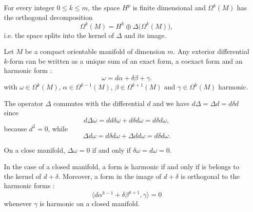 \begin{theorem}
	For every integer $0\leq k\leq m$, the space $H^p$ is finite dimensional and $\Omega^k(M)$ has the orthogonal decomposition
	\begin{equation}
		\Omega^k(M)=H^k\oplus\Delta\big( \Omega^k(M) \big),
	\end{equation}
	i.e. the space splits into the kernel of $\Delta$ and its image.
\end{theorem}

\begin{theorem}
	Let $M$ be a compact orientable manifold of dimension $m$. Any exterior differential $k$-form can be written as a unique sum of an exact form, a coexact form and an harmonic form :
	\begin{equation}
		\omega=d\alpha+\delta\beta+\gamma.
	\end{equation}
	with $\omega\in\Omega^k(M)$, $\alpha\in\Omega^{k-1}(M)$, $\beta\in\Omega^{k+1}(M)$ and $\gamma\in\Omega^k(M)$ harmonic.
\end{theorem}

The operator $\Delta$ commutes with the differential $d$ and we have $d\Delta=\Delta d= d\delta d$ since
\begin{equation}
	d\Delta \omega=dd\delta\omega+d\delta d\omega=d\delta d\omega,
\end{equation}
because $d^2=0$, while
\begin{equation}
	\Delta d\omega=d\delta d\omega+\Delta d d\omega=d\delta d\omega.
\end{equation}

\begin{lemma}
	On a close manifold, $\Delta\omega=0$ if and only if $\delta\omega=d\omega=0$.
\end{lemma}

In the case of a closed manifold, a form is harmonic if and only if is belongs to the kernel of $d+\delta$. Moreover, a form in the image of $d+\delta$ is orthogonal to the harmonic forms :
\begin{equation}
	\langle d\alpha^{k-1}+\delta\beta^{k+1}, \gamma\rangle =0
\end{equation}
whenever $\gamma$ is harmonic on a closed manifold.
